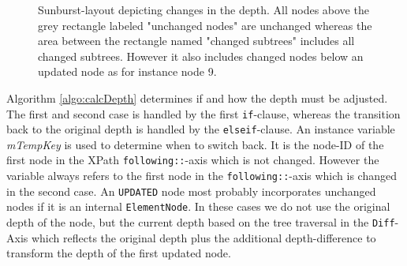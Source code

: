 \begin{figure}[tb]
\caption{\label{fig:sunburst-layout} Sunburst-layout depicting changes in the depth. All nodes above the grey rectangle labeled "unchanged nodes" are unchanged whereas the area between the rectangle named "changed subtrees" includes all changed subtrees. However it also includes changed nodes below an updated node as for instance node 9.}
\end{figure}

Algorithm \ref{algo:calcDepth} determines if and how the depth must be adjusted. The first and second case is handled by the first \texttt{if}-clause, whereas the transition back to the original depth is handled by the \texttt{elseif}-clause. An instance variable \emph{mTempKey} is used to determine when to switch back. It is the node-ID of the first node in the XPath \texttt{following::}-axis which is not changed. However the variable always refers to the first node in the \texttt{following::}-axis which is changed in the second case. An \texttt{UPDATED} node most probably incorporates unchanged nodes if it is an internal \texttt{ElementNode}. In these cases we do not use the original depth of the node, but the current depth based on the tree traversal in the \texttt{Diff}-Axis which reflects the original depth plus the additional depth-difference to transform the depth of the first updated node.

